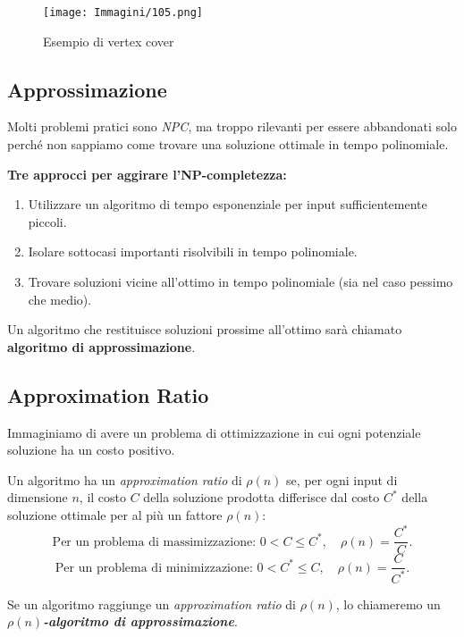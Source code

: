 \documentclass{article}
\begin{document}
\begin{figure}[H]
    \centering
    \texttt{[image: Immagini/105.png]}
    \caption{Esempio di vertex cover}
    \label{fig:vertex-cover-example-2}
\end{figure}

\subsection{Approssimazione}
Molti problemi pratici sono \textit{NPC}, ma troppo rilevanti per essere abbandonati solo perché non sappiamo come trovare una soluzione ottimale in tempo polinomiale.

\textbf{Tre approcci per aggirare l’NP-completezza:}
\begin{enumerate}
    \item Utilizzare un algoritmo di tempo esponenziale per input sufficientemente piccoli.
    \item Isolare sottocasi importanti risolvibili in tempo polinomiale.
    \item Trovare soluzioni vicine all’ottimo in tempo polinomiale (sia nel caso pessimo che medio).
\end{enumerate}

Un algoritmo che restituisce soluzioni prossime all’ottimo sarà chiamato \textbf{algoritmo di approssimazione}.

\subsection*{Approximation Ratio}
Immaginiamo di avere un problema di ottimizzazione in cui ogni potenziale soluzione ha un costo positivo.

\begin{tcolorbox}[colback=yellow!10!white, colframe=yellow!50!black, title=Definizione]
    Un algoritmo ha un \textit{approximation ratio} di $\rho(n)$ se, per ogni input di dimensione $n$, il costo $C$ della soluzione prodotta differisce dal costo $C^*$ della soluzione ottimale per al più un fattore $\rho(n)$:
    \[
    \text{Per un problema di massimizzazione: } 0 < C \leq C^*, \quad \rho(n) = \frac{C^*}{C}.
    \]
    \[
    \text{Per un problema di minimizzazione: } 0 < C^* \leq C, \quad \rho(n) = \frac{C}{C^*}.
    \]

    Se un algoritmo raggiunge un \textit{approximation ratio} di $\rho(n)$, lo chiameremo un \textbf{\textit{$\rho(n)$-algoritmo di approssimazione}}.
\end{tcolorbox}
\end{document}

